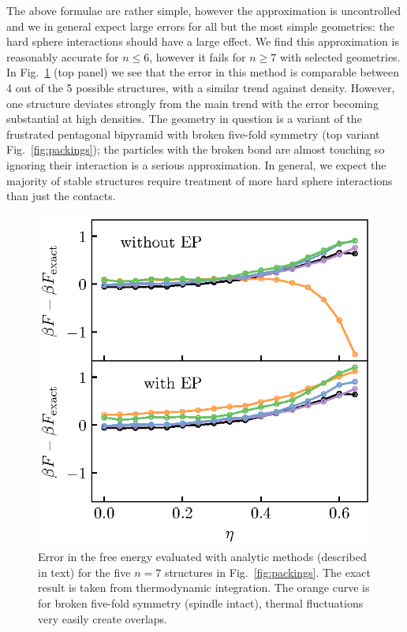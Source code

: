 \documentclass[11pt,twoside]{report}
\begin{document}
The above formulae are rather simple, however the approximation is uncontrolled and we in general expect large errors for all but the most simple geometries: the hard sphere interactions should have a large effect.
We find this approximation is reasonably accurate for $n \le 6$, however it fails for $n \ge 7$ with selected geometries.
In Fig.\ \ref{fig:ep-n7} (top panel) we see that the error in this method is comparable between 4 out of the 5 possible structures, with a similar trend against density.
However, one structure deviates strongly from the main trend with the error becoming substantial at high densities.
The geometry in question is a variant of the frustrated pentagonal bipyramid with broken five-fold symmetry (top variant Fig.\ \ref{fig:packings}); the particles with the broken bond are almost touching so ignoring their interaction is a serious approximation.
In general, we expect the majority of stable structures require treatment of more hard sphere interactions than just the contacts.

\begin{figure}
  \includegraphics[width=0.9\linewidth,outer]{ep-n7}
  \caption[Errors in EP]{
    Error in the free energy evaluated with analytic methods (described in text) for the five $n = 7$ structures in Fig.\ \ref{fig:packings}.
    The exact result is taken from thermodynamic integration.
    The orange curve is for broken five-fold symmetry (spindle intact), thermal fluctuations very easily create overlaps.
  }
  \label{fig:ep-n7}
\end{figure}
\end{document}
